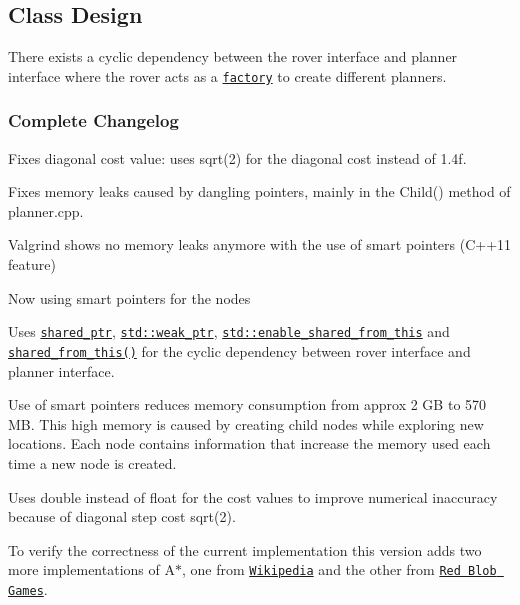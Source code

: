 \subsection*{Class Design}

There exists a cyclic dependency between the rover interface and planner interface where the rover acts as a \href{https://en.wikipedia.org/wiki/Factory_method_pattern}{\tt factory} to create different planners.

\subsubsection*{Complete Changelog}


\begin{DoxyItemize}
\item Fixes diagonal cost value\+: uses sqrt(2) for the diagonal cost instead of 1.\+4f.
\item Fixes memory leaks caused by dangling pointers, mainly in the Child() method of planner.\+cpp.
\begin{DoxyItemize}
\item Valgrind shows no memory leaks anymore with the use of smart pointers (C++11 feature)
\item Now using smart pointers for the nodes
\item Uses \href{https://en.cppreference.com/w/cpp/memory/shared_ptr}{\tt shared\+\_\+ptr}, \href{http://en.cppreference.com/w/cpp/memory/weak_ptr}{\tt std\+::weak\+\_\+ptr}, \href{http://en.cppreference.com/w/cpp/memory/enable_shared_from_this}{\tt std\+::enable\+\_\+shared\+\_\+from\+\_\+this} and \href{https://en.cppreference.com/w/cpp/memory/enable_shared_from_this/shared_from_this}{\tt shared\+\_\+from\+\_\+this()} for the cyclic dependency between rover interface and planner interface.
\item Use of smart pointers reduces memory consumption from approx 2 GB to 570 MB. This high memory is caused by creating child nodes while exploring new locations. Each node contains information that increase the memory used each time a new node is created.
\end{DoxyItemize}
\item Uses double instead of float for the cost values to improve numerical inaccuracy because of diagonal step cost sqrt(2).
\item To verify the correctness of the current implementation this version adds two more implementations of A$\ast$, one from \href{https://en.wikipedia.org/wiki/A*_search_algorithm#Pseudocode}{\tt Wikipedia} and the other from \href{https://www.redblobgames.com/pathfinding/a-star/implementation.html#cpp-astar}{\tt Red Blob Games}.

\end{DoxyItemize}
